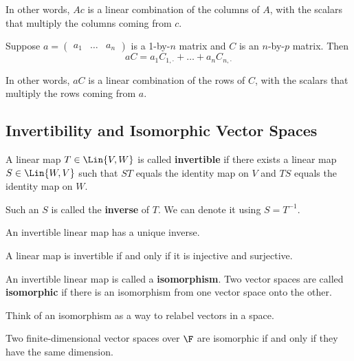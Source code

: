 In other words, $Ac$ is a linear combination of the columns of $A$,
with the scalars that multiply the columns coming from $c$.

\begin{theorem}
   Suppose $a = \begin{pmatrix*} a_1 & \dots & a_n \end{pmatrix*}$ is
   a 1-by-$n$ matrix and $C$ is an $n$-by-$p$ matrix. Then
   \[ aC = a_1 C_{1, \cdot} + \dots + a_n C_{n, \cdot} \]
\end{theorem}

In other words, $aC$ is a linear combination of the rows of $C$,
with the scalars that multiply the rows coming from $a$.

\subsection{Invertibility and Isomorphic Vector Spaces}

\begin{definition} 
   A linear map $T \in \Lin{V, W}$ is called \textbf{invertible} if
   there exists a linear map $S \in \Lin{W, V}$ such that $ST$ equals
   the identity map on $V$ and $TS$ equals the identity map on $W$.

   Such an $S$ is called the \textbf{inverse} of $T$. We can denote
   it using $S = T^{-1}$.
\end{definition}

\begin{theorem} 
   An invertible linear map has a unique inverse.
\end{theorem}

\begin{theorem}
   A linear map is invertible if and only if it is injective and surjective.
\end{theorem}

\begin{definition} 
   An invertible linear map is called a \textbf{isomorphism}. Two
   vector spaces are called \textbf{isomorphic} if there is
   an isomorphism from one vector space onto the other.
\end{definition}

Think of an isomorphism as a way to relabel vectors in a space.

\begin{theorem} 
   Two finite-dimensional vector spaces over $\F$ are isomorphic
   if and only if they have the same dimension.
\end{theorem}

